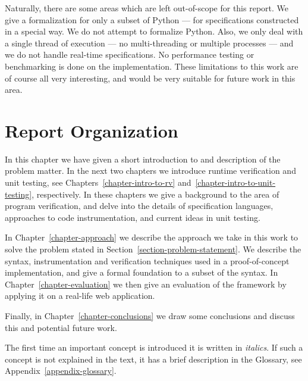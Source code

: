 Naturally, there are some areas which are left out-of-scope for this report. We
give a formalization for only a subset of Python --- for specifications
constructed in a special way. We do not attempt to formalize Python. Also, we
only deal with a single thread of execution --- no multi-threading or multiple
processes --- and we do not handle real-time specifications. No performance
testing or benchmarking is done on the implementation. These limitations to
this work are of course all very interesting, and would be very suitable for
future work in this area.


\section{Report Organization}

In this chapter we have given a short introduction to and description of the
problem matter. In the next two chapters we introduce runtime verification and
unit testing, see Chapters~\ref{chapter-intro-to-rv}
and~\ref{chapter-intro-to-unit-testing}, respectively. In these chapters we
give a background to the area of program verification, and delve into the
details of specification languages, approaches to code instrumentation, and
current ideas in unit testing.

In Chapter~\ref{chapter-approach} we describe the approach we take in this work to
solve the problem stated in Section~\ref{section-problem-statement}. We
describe the syntax, instrumentation and verification techniques used in a
proof-of-concept implementation, and give a formal foundation to a subset of
the syntax. In Chapter~\ref{chapter-evaluation} we then give an evaluation of
the framework by applying it on a real-life web application.

Finally, in Chapter~\ref{chapter-conclusions} we draw some conclusions and
discuss this and potential future work.

The first time an important concept is introduced it is written in
\textit{italics}. If such a concept is not explained in the text, it has a
brief description in the Glossary, see Appendix~\ref{appendix-glossary}.
